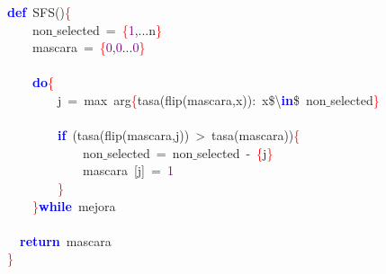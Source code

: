 \noindent
\mbox{}\textbf{\textcolor{Blue}{def}}\ SFS\textcolor{BrickRed}{()}\textcolor{Red}{\{} \\
\mbox{}\ \ \ \ non$\_$selected\ \textcolor{BrickRed}{=}\ \textcolor{Red}{\{}\textcolor{Purple}{1}\textcolor{BrickRed}{,...}n\textcolor{Red}{\}} \\
\mbox{}\ \ \ \ mascara\ \textcolor{BrickRed}{=}\ \textcolor{Red}{\{}\textcolor{Purple}{0}\textcolor{BrickRed}{,}\textcolor{Purple}{0}\textcolor{BrickRed}{...}\textcolor{Purple}{0}\textcolor{Red}{\}} \\
\mbox{} \\
\mbox{}\ \ \ \ \textbf{\textcolor{Blue}{do}}\textcolor{Red}{\{} \\
\mbox{}\ \ \ \ \ \ \ \ j\ \textcolor{BrickRed}{=}\ max\ arg\textcolor{Red}{\{}tasa\textcolor{BrickRed}{(}flip\textcolor{BrickRed}{(}mascara\textcolor{BrickRed}{,}x\textcolor{BrickRed}{)):}\ x\$\textcolor{BrickRed}{\textbackslash{}}\textbf{\textcolor{Blue}{in}}\$\ non$\_$selected\textcolor{Red}{\}} \\
\mbox{} \\
\mbox{}\ \ \ \ \ \ \ \ \textbf{\textcolor{Blue}{if}}\ \textcolor{BrickRed}{(}tasa\textcolor{BrickRed}{(}flip\textcolor{BrickRed}{(}mascara\textcolor{BrickRed}{,}j\textcolor{BrickRed}{))}\ \textcolor{BrickRed}{\textgreater{}}\ tasa\textcolor{BrickRed}{(}mascara\textcolor{BrickRed}{))}\textcolor{Red}{\{} \\
\mbox{}\ \ \ \ \ \ \ \ \ \ \ \ non$\_$selected\ \textcolor{BrickRed}{=}\ non$\_$selected\ \textcolor{BrickRed}{-}\ \textcolor{Red}{\{}j\textcolor{Red}{\}} \\
\mbox{}\ \ \ \ \ \ \ \ \ \ \ \ mascara\ \textcolor{BrickRed}{[}j\textcolor{BrickRed}{]}\ \textcolor{BrickRed}{=}\ \textcolor{Purple}{1} \\
\mbox{}\ \ \ \ \ \ \ \ \textcolor{Red}{\}} \\
\mbox{}\ \ \ \ \textcolor{Red}{\}}\textbf{\textcolor{Blue}{while}}\ mejora \\
\mbox{} \\
\mbox{}\ \ \textbf{\textcolor{Blue}{return}}\ mascara \\
\mbox{}\textcolor{Red}{\}} \\
\mbox{}
